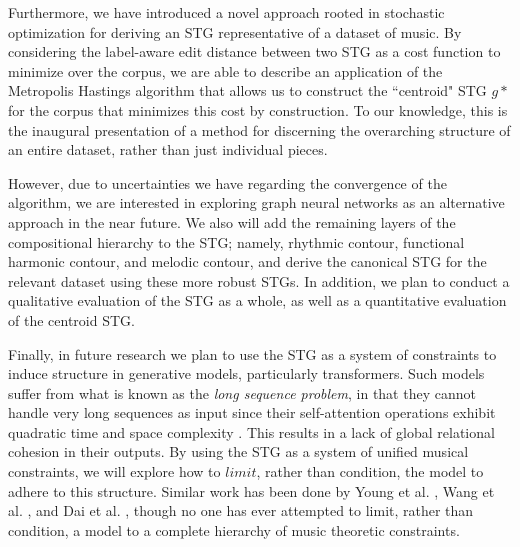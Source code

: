 \documentclass{article}
\begin{document}
Furthermore, we have introduced a novel approach rooted in stochastic optimization for deriving an STG representative of a dataset of music. By considering the label-aware edit distance between two STG as a cost function to minimize over the corpus, we are able to describe an application of the Metropolis Hastings algorithm that allows us to construct the ``centroid" STG $g*$ for the corpus that minimizes this cost by construction. To our knowledge, this is the inaugural presentation of a method for discerning the overarching structure of an entire dataset, rather than just individual pieces.

However, due to uncertainties we have regarding the convergence of the algorithm, we are interested in exploring graph neural networks as an alternative approach in the near future. We also will add the remaining layers of the compositional hierarchy to the STG; namely, rhythmic contour, functional harmonic contour, and melodic contour, and derive the canonical STG for the relevant dataset using these more robust STGs. In addition, we plan to conduct a qualitative evaluation of the STG as a whole, as well as a quantitative evaluation of the centroid STG. 


Finally, in future research we plan to use the STG as a system of constraints to induce structure in generative models, particularly transformers. Such models suffer from what is known as the \textit{long sequence problem}, in that they cannot handle very long sequences as input since their self-attention operations exhibit quadratic time and space complexity \cite{mao2024iceformer}. This results in a lack of global relational cohesion in their outputs. By using the STG as a system of unified musical constraints, we will explore how to $limit$, rather than condition, the model to adhere to this structure. Similar work has been done by Young et al. \cite{young_2022}, Wang et al. \cite{wang2024wholesong}, and Dai et al. \cite{musicframeworks}, though no one has ever attempted to limit, rather than condition, a model to a complete hierarchy of music theoretic constraints. 


\end{document}
